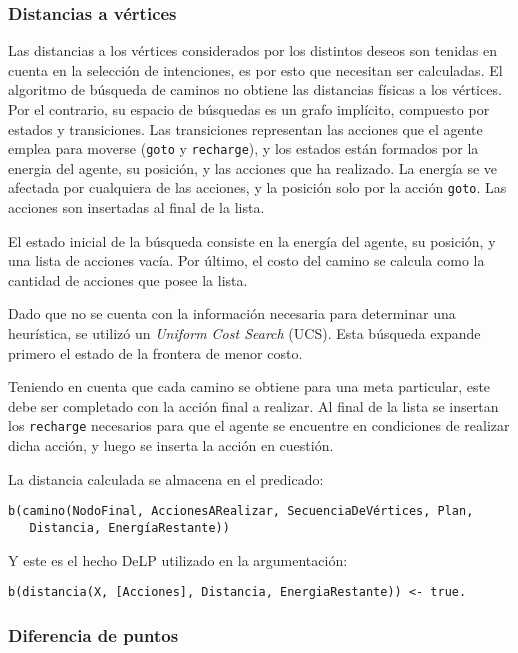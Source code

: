 \documentclass[oneside]{book}
\begin{document}
\subsubsection{Distancias a vértices}

Las distancias a los vértices considerados por los distintos deseos son tenidas en 
cuenta en la selección de intenciones, es por esto que necesitan ser calculadas.
El algoritmo de búsqueda de caminos no obtiene las distancias físicas a los vértices.
Por el contrario, su espacio de búsquedas es un grafo implícito, compuesto por estados
y transiciones. Las transiciones representan las acciones que el agente emplea
para moverse (\texttt{goto} y \texttt{recharge}), y los estados están formados por 
la energia del agente, su posición, y las acciones que ha realizado. La energía se ve
afectada por cualquiera de las acciones, y la posición solo por la acción \texttt{goto}.
Las acciones son insertadas al final de la lista.

El estado inicial de la búsqueda consiste en la energía del agente, su posición, y una 
lista de acciones vacía. Por último, el costo del camino se calcula como la cantidad de 
acciones que posee la lista.

Dado que no se cuenta con la información necesaria para determinar una heurística, se 
utilizó un \textit{Uniform Cost Search} (UCS). Esta búsqueda expande primero el estado
de la frontera de menor costo.

Teniendo en cuenta que cada camino se obtiene para una meta particular, este debe ser
completado con la acción final a realizar. Al final de la lista se insertan los 
\texttt{recharge} necesarios para que el agente se encuentre en condiciones de realizar 
dicha acción, y luego se inserta la acción en cuestión.

La distancia calculada se almacena en el predicado:

\begin{verbatim}
b(camino(NodoFinal, AccionesARealizar, SecuenciaDeVértices, Plan, 
   Distancia, EnergíaRestante))
\end{verbatim}

Y este es el hecho DeLP utilizado en la argumentación:

\begin{verbatim}
b(distancia(X, [Acciones], Distancia, EnergiaRestante)) <- true.
\end{verbatim}

\subsubsection{Diferencia de puntos}
\end{document}
